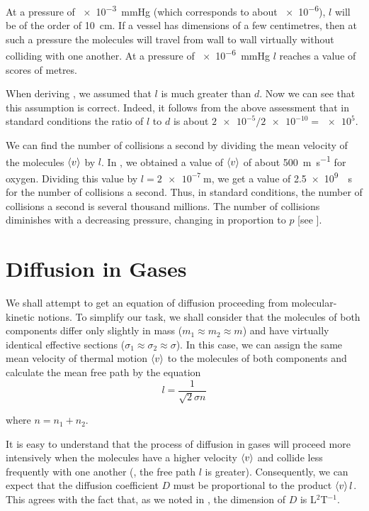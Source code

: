 At a pressure of \SI{e-3}{\mmHg} (which corresponds to about \SI{e-6}{\atm}), $l$ will be of the order of \SI{10}{\centi\metre}. If a vessel has dimensions of a few centimetres, then at such a pressure the molecules will travel from wall to wall virtually without colliding with one another. At a pressure of \SI{e-6}{\mmHg} $l$ reaches a value of scores of metres.

When deriving , we assumed that $l$ is much greater than $d$. Now we can see that this assumption is correct. Indeed, it follows from the above assessment that in standard conditions the ratio of $l$ to $d$ is about $\num{2e-5}/\num{2e-10} = \num{e5}$.

We can find the number of collisions a second by dividing the mean velocity of the molecules $\left\langle v \right\rangle$ by $l$. In , we obtained a value of $\left\langle v \right\rangle$ of about \SI{500}{\metre\per\second} for oxygen. Dividing this value by $l=\SI{2e-7}{\metre}$, we get a value of \SI{2.5e9}{\per\second} for the number of collisions a second. Thus, in standard conditions, the number of collisions a second is several thousand millions. The number of collisions diminishes with a decreasing pressure, changing in proportion to $p$ [see ].

\section{Diffusion in Gases}\label{sec:16_3}

We shall attempt to get an equation of diffusion proceeding from molecular-kinetic notions. To simplify our task, we shall consider that the molecules of both components differ only slightly in mass ($m_1\approx m_2\approx m$) and have virtually identical effective sections ($\sigma_1\approx\sigma_2\approx\sigma$). In this case, we
can assign the same mean velocity of thermal motion $\left\langle v \right\rangle$ to the molecules of both components and calculate the mean free path by the equation
\begin{equation*}
    l = \frac{1}{\sqrt{2}\sigma n}
\end{equation*}

\noindent
where $n=n_1+n_2$.

It is easy to understand that the process of diffusion in gases will proceed more intensively when the molecules have a higher velocity $\left\langle v \right\rangle$ and collide less frequently with one another (\ie, the free path $l$ is greater). Consequently, we can expect that the diffusion coefficient $D$ must be proportional to the product $\left\langle v \right\rangle l$. This agrees with the fact that, as we noted in , the dimension of $D$ is L$^2$T$^{-1}$.

